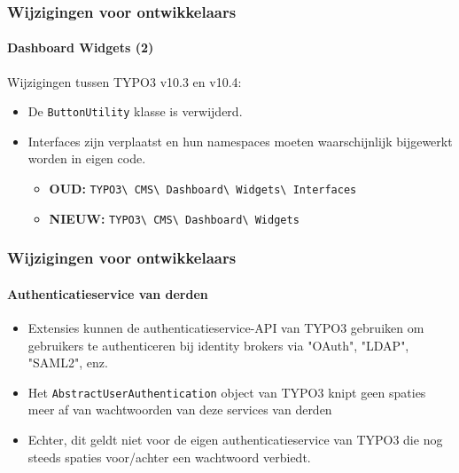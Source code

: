 \begin{frame}[fragile]
	\frametitle{Wijzigingen voor ontwikkelaars}
	\framesubtitle{Dashboard Widgets (2)}

	Wijzigingen tussen TYPO3 v10.3 en v10.4:

	\begin{itemize}
		\item De \texttt{ButtonUtility} klasse is verwijderd.
		\item Interfaces zijn verplaatst en hun namespaces moeten waarschijnlijk
			bijgewerkt worden in eigen code.
			\begin{itemize}\smaller
				\item \textbf{OUD:}
					\texttt{TYPO3\textbackslash
						CMS\textbackslash
						Dashboard\textbackslash
						Widgets\textbackslash
						Interfaces}
				\item \textbf{NIEUW:}
					\texttt{TYPO3\textbackslash
						CMS\textbackslash
						Dashboard\textbackslash
						Widgets}
			\end{itemize}\normalsize
	\end{itemize}

\end{frame}


\begin{frame}[fragile]
	\frametitle{Wijzigingen voor ontwikkelaars}
	\framesubtitle{Authenticatieservice van derden}

	\begin{itemize}

		\item Extensies kunnen de authenticatieservice-API van TYPO3 gebruiken om gebruikers
			te authenticeren bij identity brokers via "OAuth", "LDAP", "SAML2", enz.
		\item Het \texttt{AbstractUserAuthentication} object van TYPO3 knipt geen spaties meer af van
			wachtwoorden van deze services van derden
		\item Echter, dit geldt niet voor de eigen authenticatieservice van TYPO3 die nog steeds
			spaties voor/achter een wachtwoord verbiedt.

	\end{itemize}

\end{frame}


